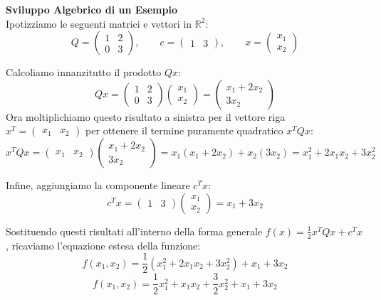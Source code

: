 \documentclass[12pt, a4paper]{article}
\begin{document}
	\vspace{0.4cm}
	\textbf{Sviluppo Algebrico di un Esempio}\\
	Ipotizziamo le seguenti matrici e vettori in $\mathbb{R}^2$:
	\[
	Q = \begin{pmatrix} 1 & 2 \\ 0 & 3 \end{pmatrix}, \qquad c = \begin{pmatrix} 1 & 3 \end{pmatrix}, \qquad x = \begin{pmatrix} x_1 \\ x_2 \end{pmatrix}
	\]
	
	Calcoliamo innanzitutto il prodotto $Qx$:
	\[
	Qx = \begin{pmatrix} 1 & 2 \\ 0 & 3 \end{pmatrix} \begin{pmatrix} x_1 \\ x_2 \end{pmatrix} = \begin{pmatrix} x_1 + 2x_2 \\ 3x_2 \end{pmatrix}
	\]
	Ora moltiplichiamo questo risultato a sinistra per il vettore riga $x^T = \begin{pmatrix} x_1 & x_2 \end{pmatrix}$ per ottenere il termine puramente quadratico $x^T Q x$:
	\[
	x^T Q x = \begin{pmatrix} x_1 & x_2 \end{pmatrix} \begin{pmatrix} x_1 + 2x_2 \\ 3x_2 \end{pmatrix} = x_1(x_1 + 2x_2) + x_2(3x_2) = x_1^2 + 2x_1 x_2 + 3x_2^2
	\]
	
	Infine, aggiungiamo la componente lineare $c^T x$:
	\[
	c^T x = \begin{pmatrix} 1 & 3 \end{pmatrix} \begin{pmatrix} x_1 \\ x_2 \end{pmatrix} = x_1 + 3x_2
	\]
	
	Sostituendo questi risultati all'interno della forma generale $f(x) = \frac{1}{2} x^T Q x + c^T x$, ricaviamo l'equazione estesa della funzione:
	\[
	f(x_1, x_2) = \frac{1}{2} (x_1^2 + 2x_1 x_2 + 3x_2^2) + x_1 + 3x_2
	\]
	\[
	f(x_1, x_2) = \frac{1}{2} x_1^2 + x_1 x_2 + \frac{3}{2} x_2^2 + x_1 + 3x_2
	\]
	
\end{document}
